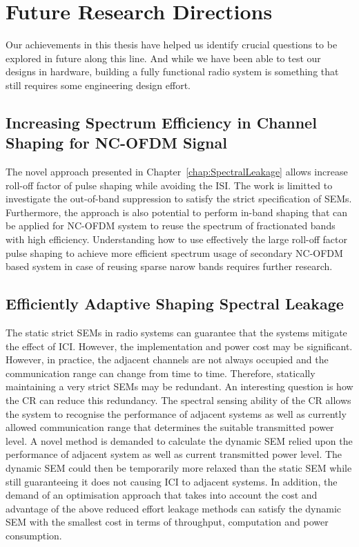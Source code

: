 \section{Future Research Directions}

Our achievements in this thesis have helped us identify crucial questions to be explored in future along this line. And while we have been able to test our designs in hardware, building a fully functional radio system is something that still requires some engineering design effort.

\subsection{Increasing Spectrum Efficiency in Channel Shaping for NC-OFDM Signal}
The novel approach presented in Chapter~\ref{chap:SpectralLeakage} allows increase roll-off factor of pulse shaping while avoiding the ISI.
The work is limitted to investigate the out-of-band suppression to satisfy the strict specification of SEMs. 
Furthermore, the approach is also potential to perform in-band shaping that can be applied for NC-OFDM system to reuse the spectrum of fractionated bands with high efficiency.
Understanding how to use effectively the large roll-off factor pulse shaping to achieve more efficient spectrum usage of secondary NC-OFDM based system in case of reusing sparse narow bands requires further research.

\subsection{Efficiently Adaptive Shaping Spectral Leakage}
The static strict SEMs in radio systems can guarantee that the systems mitigate the effect of ICI. However, the implementation and power cost may be significant.
However, in practice, the adjacent channels are not always occupied and the communication range can change from time to time. Therefore, statically maintaining a very strict SEMs may be redundant.
An interesting question is how the CR can reduce this redundancy.
The spectral sensing ability of the CR allows the system to recognise the performance of adjacent systems as well as currently allowed communication range that determines the suitable transmitted power level.
A novel method is demanded to calculate the dynamic SEM relied upon the performance of adjacent system as well as current transmitted power level.
The dynamic SEM could then be temporarily more relaxed than the static SEM while still guaranteeing it does not causing ICI to adjacent systems.
In addition, the demand of an optimisation approach that takes into account the cost and advantage of the above reduced effort leakage methods can satisfy the dynamic SEM with the smallest cost in terms of throughput, computation and power consumption.

